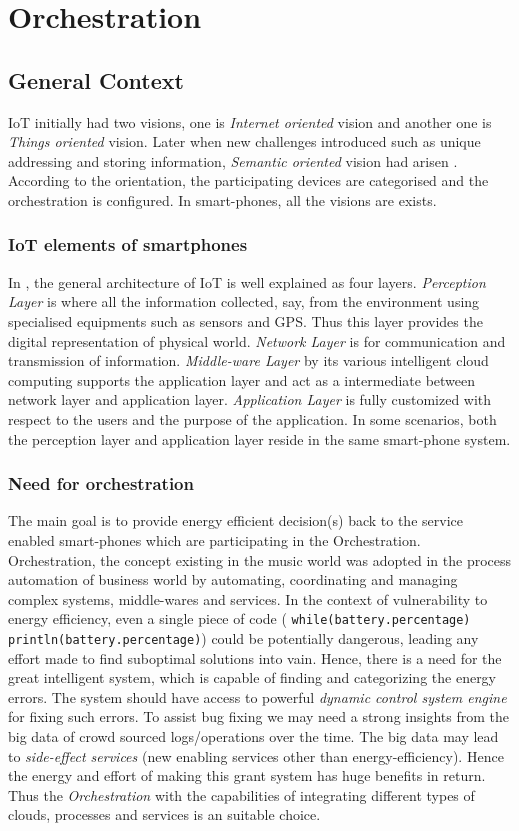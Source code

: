 \chapter{Orchestration}

\section{General Context}
IoT initially had two visions, one is \textit{Internet oriented} vision and another one is \textit{Things oriented} vision. Later when new challenges introduced such as unique addressing and storing information, \emph{Semantic oriented} vision had arisen \cite{IoT:Survey}. According to the orientation, the participating devices are categorised and the orchestration is configured. In smart-phones, all the visions are exists. 
\subsection{IoT elements of smartphones}
In \cite{IoT:Arch}, the general architecture of IoT is well explained as four layers. \emph{Perception Layer} is where all the information collected, say, from the environment using specialised equipments such as sensors and GPS. Thus this layer provides the digital representation of physical world. \emph{Network Layer} is for communication and transmission of information. \emph{Middle-ware Layer} by its various intelligent cloud computing supports the application layer and act as a intermediate between network layer and application layer. \emph{Application Layer} is fully customized with respect to the users and the purpose of the application. In some scenarios, both the perception layer and application layer reside in the same smart-phone system.
\subsection{Need for orchestration}
The main goal is to provide energy efficient decision(s) back to the service enabled smart-phones which are participating in the Orchestration. Orchestration, the concept existing in the music world was adopted in the process automation of business world by automating, coordinating and managing complex systems, middle-wares and services. In the context of vulnerability to energy efficiency, even a single piece of code  ( {\tt while(battery.percentage) println(battery.percentage)}) could be potentially dangerous, leading any effort made to find suboptimal solutions into vain. Hence, there is a need for the great intelligent system, which is capable of finding and categorizing the energy errors. The system should have access to powerful \textit{dynamic control system engine} for fixing such errors. To assist bug fixing we may need a strong insights from the big data of crowd sourced logs/operations  over the time. The big data may lead to \emph{side-effect services} (new enabling services other than energy-efficiency). Hence the energy and effort of making this grant system has huge benefits in return. Thus the \emph{Orchestration}  with the capabilities of integrating different types of clouds, processes and services is an suitable choice. 

